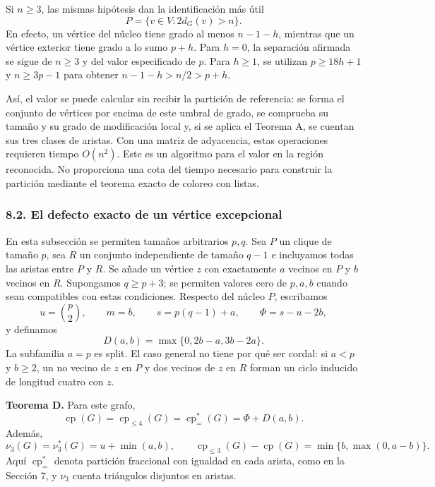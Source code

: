 \documentclass[spanish,11pt,a4paper]{article}
\begin{document}
Si \(n\ge3\), las mismas hipótesis dan la identificación más útil \[
P=\{v\in V:2d_G(v)>n\}.
\] En efecto, un vértice del núcleo tiene grado al menos \(n-1-h\),
mientras que un vértice exterior tiene grado a lo sumo \(p+h\). Para
\(h=0\), la separación afirmada se sigue de \(n\ge3\) y del valor
especificado de \(p\). Para \(h\ge1\), se utilizan \(p\ge18h+1\) y
\(n\ge3p-1\) para obtener \(n-1-h>n/2>p+h\).

Así, el valor se puede calcular sin recibir la partición de referencia:
se forma el conjunto de vértices por encima de este umbral de grado, se
comprueba su tamaño y su grado de modificación local y, si se aplica el
Teorema A, se cuentan sus tres clases de aristas. Con una matriz de
adyacencia, estas operaciones requieren tiempo \(O(n^2)\). Este es un
algoritmo para el valor en la región reconocida. No proporciona una cota
del tiempo necesario para construir la partición mediante el teorema
exacto de coloreo con listas.

\subsubsection{8.2. El defecto exacto de un vértice
excepcional}\label{el-defecto-exacto-de-un-vuxe9rtice-excepcional}

En esta subsección se permiten tamaños arbitrarios \(p,q\). Sea \(P\) un
clique de tamaño \(p\), sea \(R\) un conjunto independiente de tamaño
\(q-1\) e incluyamos todas las aristas entre \(P\) y \(R\). Se añade un
vértice \(z\) con exactamente \(a\) vecinos en \(P\) y \(b\) vecinos en
\(R\). Supongamos \(q\ge p+3\); se permiten valores cero de \(p,a,b\)
cuando sean compatibles con estas condiciones. Respecto del núcleo
\(P\), escribamos \[
u=\binom p2,\qquad m=b,\qquad s=p(q-1)+a,\qquad \Phi=s-u-2b,
\] y definamos \[
D(a,b)=\max\{0,2b-a,3b-2a\}.
\] La subfamilia \(a=p\) es split. El caso general no tiene por qué ser
cordal: si \(a<p\) y \(b\ge2\), un no vecino de \(z\) en \(P\) y dos
vecinos de \(z\) en \(R\) forman un ciclo inducido de longitud cuatro
con \(z\).

\textbf{Teorema D.} Para este grafo, \[
\operatorname{cp}(G)=\operatorname{cp}_{\le4}(G)
=\operatorname{cp}^{*}_{=}(G)=\Phi+D(a,b).
\] Además, \[
\nu_3(G)=\nu_3^*(G)=u+\min(a,b),\qquad
\operatorname{cp}_{\le3}(G)-\operatorname{cp}(G)
=\min\{b,\max(0,a-b)\}.
\] Aquí \(\operatorname{cp}^{*}_{=}\) denota partición fraccional con
igualdad en cada arista, como en la Sección 7, y \(\nu_3\) cuenta
triángulos disjuntos en aristas.
\end{document}
